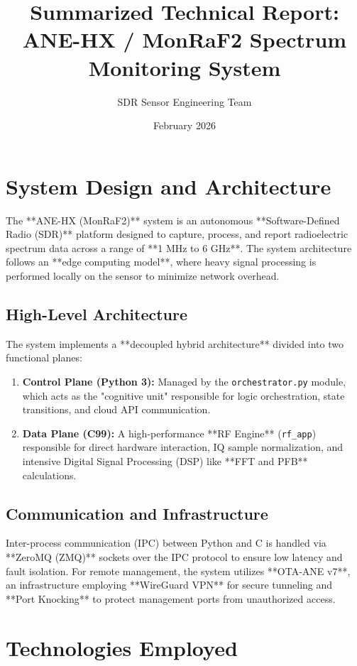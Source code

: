 \documentclass[a4paper,12pt]{article}
\title{Summarized Technical Report: ANE-HX / MonRaF2 Spectrum Monitoring System}
\author{SDR Sensor Engineering Team}
\date{February 2026}
\begin{document}
\maketitle

\section{System Design and Architecture}
The **ANE-HX (MonRaF2)** system is an autonomous **Software-Defined Radio (SDR)** platform designed to capture, process, and report radioelectric spectrum data across a range of **1 MHz to 6 GHz**. The system architecture follows an **edge computing model**, where heavy signal processing is performed locally on the sensor to minimize network overhead.

\subsection{High-Level Architecture}
The system implements a **decoupled hybrid architecture** divided into two functional planes:
\begin{enumerate}
    \item \textbf{Control Plane (Python 3):} Managed by the \texttt{orchestrator.py} module, which acts as the "cognitive unit" responsible for logic orchestration, state transitions, and cloud API communication.
    \item \textbf{Data Plane (C99):} A high-performance **RF Engine** (\texttt{rf\_app}) responsible for direct hardware interaction, IQ sample normalization, and intensive Digital Signal Processing (DSP) like **FFT and PFB** calculations.
\end{enumerate}

\subsection{Communication and Infrastructure}
Inter-process communication (IPC) between Python and C is handled via **ZeroMQ (ZMQ)** sockets over the IPC protocol to ensure low latency and fault isolation. For remote management, the system utilizes **OTA-ANE v7**, an infrastructure employing **WireGuard VPN** for secure tunneling and **Port Knocking** to protect management ports from unauthorized access.

\section{Technologies Employed}
\end{document}
